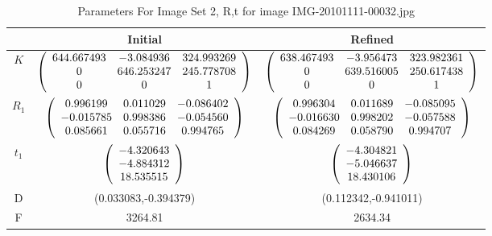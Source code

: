 \documentclass[12pt]{article}
\begin{document}
\begin{table}[!h]
\centering
\begin{tabular}{|c|c|c|}
\hline
 & Initial & Refined \\
\hline
$K$ & $
\left( {\begin{array}{*{20}c}
   {644.667493} & {-3.084936} & {324.993269}  \\
   {0} & {646.253247} & {245.778708}  \\
   {0} & {0} & {1}  \\
\end{array}} \right)
$
& $
\left( {\begin{array}{*{20}c}
   {638.467493} & {-3.956473} & {323.982361}  \\
   {0} & {639.516005} & {250.617438}  \\
   {0} & {0} & {1}  \\
\end{array}} \right)
$\\
\hline
$R_1$ & $
\left( {\begin{array}{*{20}c}
   {0.996199} & {0.011029} & {-0.086402}  \\
   {-0.015785} & {0.998386} & {-0.054560}  \\
   {0.085661} & {0.055716} & {0.994765}  \\
\end{array}} \right)
$ & $
\left( {\begin{array}{*{20}c}
   {0.996304} & {0.011689} & {-0.085095}  \\
   {-0.016630} & {0.998202} & {-0.057588}  \\
   {0.084269} & {0.058790} & {0.994707}  \\
\end{array}} \right)
$\\
\hline
$t_1$ & $
\left( {\begin{array}{*{20}c}
   {-4.320643}  \\
   {-4.884312}  \\
   {18.535515}  \\
\end{array}} \right)
$
& $
\left( {\begin{array}{*{20}c}
   {-4.304821}  \\
   {-5.046637}  \\
   {18.430106}  \\
\end{array}} \right)
$
\\
\hline
D & (0.033083,-0.394379) & (0.112342,-0.941011) \\
\hline
F & 3264.81 & 2634.34 \\
\hline
\end{tabular}
\caption{Parameters For Image Set 2, R,t for image IMG-20101111-00032.jpg}
\end{table}
\end{document}
